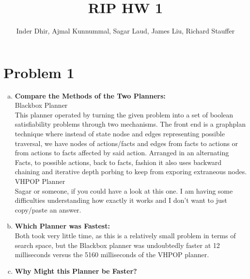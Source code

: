 \documentclass[]{article}
\title{RIP HW 1}
\author{Inder Dhir, Ajmal Kunnummal, Sagar Laud, James Liu, Richard Stauffer}
\begin{document}
\maketitle


\section{Problem 1}
	\begin{enumerate}[(a)]
	\item \textbf{Compare the Methods of the Two Planners:}\\
	Blackbox Planner\\
		This planner operated by turning the given problem into a set of boolean satisfiability problems through two mechanisms. The front end is a graphplan technique where instead of state nodse and edges representing possible traversal, we have nodes of actions/facts and edges from facts to actions or from actions to facts affected by said action. Arranged in an alternating Facts, to possible actions, back to facts, fashion it also uses backward chaining and iterative depth porbing to keep from exporing extraneous nodes. \\
	
	VHPOP Planner\\
		Sagar or someone, if you could have a look at this one. I am having some difficulties understanding how exactly it works and I don't want to just copy/paste an answer. 	
	
	\item \textbf{Which Planner was Fastest:}\\
	Both took very little time, as this is a relatively small problem in terms of search space, but  the Blackbox planner was undoubtedly faster at 12 milliseconds versus the 5160 milliseconds of the VHPOP planner. 
	
	\item \textbf{Why Might this Planner be Faster?}\\
	
	\end{enumerate}
\end{document}
